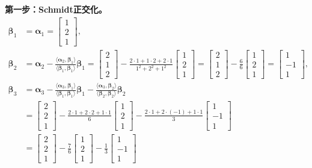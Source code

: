 \documentclass{article}
\begin{document}
\textbf{第一步：Schmidt正交化。}
\begin{align*}
\bm{\beta}_1 &= \bm{\alpha}_1 = \begin{bmatrix}1\\2\\1\end{bmatrix},\\[4pt]
\bm{\beta}_2 &= \bm{\alpha}_2 - \frac{\langle\bm{\alpha}_2,\bm{\beta}_1\rangle}{\langle\bm{\beta}_1,\bm{\beta}_1\rangle}\bm{\beta}_1
= \begin{bmatrix}2\\1\\2\end{bmatrix} - \frac{2\cdot1+1\cdot2+2\cdot1}{1^2+2^2+1^2}\begin{bmatrix}1\\2\\1\end{bmatrix}
= \begin{bmatrix}2\\1\\2\end{bmatrix} - \frac{6}{6}\begin{bmatrix}1\\2\\1\end{bmatrix}
= \begin{bmatrix}1\\-1\\1\end{bmatrix},\\[4pt]
\bm{\beta}_3 &= \bm{\alpha}_3 - \frac{\langle\bm{\alpha}_3,\bm{\beta}_1\rangle}{\langle\bm{\beta}_1,\bm{\beta}_1\rangle}\bm{\beta}_1
- \frac{\langle\bm{\alpha}_3,\bm{\beta}_2\rangle}{\langle\bm{\beta}_2,\bm{\beta}_2\rangle}\bm{\beta}_2\\
&= \begin{bmatrix}2\\2\\1\end{bmatrix} - \frac{2\cdot1+2\cdot2+1\cdot1}{6}\begin{bmatrix}1\\2\\1\end{bmatrix}
- \frac{2\cdot1+2\cdot(-1)+1\cdot1}{3}\begin{bmatrix}1\\-1\\1\end{bmatrix}\\
&= \begin{bmatrix}2\\2\\1\end{bmatrix} - \frac{7}{6}\begin{bmatrix}1\\2\\1\end{bmatrix} - \frac{1}{3}\begin{bmatrix}1\\-1\\1\end{bmatrix}

\end{align*}
\end{document}
